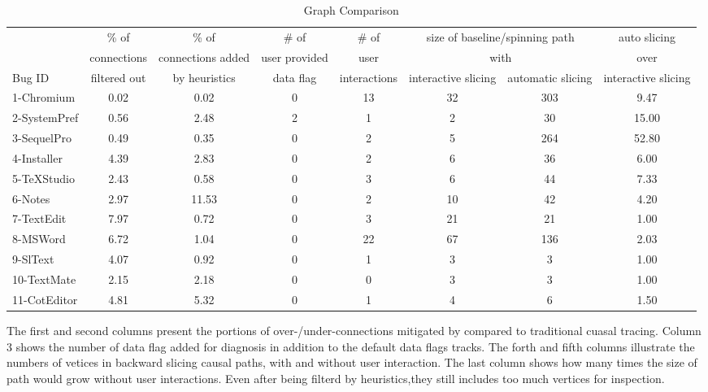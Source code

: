 \begin{table*}[ht]
\footnotesize
\centering
  \begin{tabularx}{\textwidth}{l|ccccccc}
 	   & \% of & \% of & \# of& \# of & \multicolumn{2}{c}{size of baseline/spinning path}& auto slicing\\
       & connections & connections added  & user provided & user  & \multicolumn{2}{c}{with}  & over \\
Bug ID & filtered out & by heuristics & data flag & interactions & interactive slicing & automatic slicing &  interactive slicing\\
\hline
\hline
1-Chromium & 0.02 & 0.02 & 0 & 13 & 32 & 303 & 9.47\\
2-SystemPref & 0.56 & 2.48 & 2 & 1 & 2 & 30 & 15.00\\
3-SequelPro & 0.49 & 0.35 & 0 & 2 & 5 & 264 & 52.80\\
4-Installer & 4.39 & 2.83 & 0 & 2 & 6 & 36  & 6.00\\
5-TeXStudio & 2.43 & 0.58 & 0 & 3 & 6 & 44  & 7.33\\
6-Notes & 2.97 & 11.53 & 0 & 2 & 10 & 42 & 4.20\\
7-TextEdit & 7.97 & 0.72 & 0 & 3 & 21 & 21 & 1.00\\
8-MSWord & 6.72 & 1.04 & 0 & 22 & 67 & 136 & 2.03\\
9-SlText & 4.07 & 0.92 & 0 & 1 & 3 & 3 & 1.00\\
10-TextMate & 2.15 & 2.18 & 0 & 0 & 3 & 3 & 1.00\\
11-CotEditor & 4.81 & 5.32 & 0 & 1 & 4 & 6 & 1.50\\

\hline
  \end{tabularx}

  \parbox{\textwidth}
  {\caption{Graph Comparison} 
    {The first and second columns present the portions of over-/under-connections mitigated by \xxx compared
     to traditional cuasal tracing. Column 3 shows the number of data flag added for diagnosis
     in addition to the default data flags \xxx tracks. The forth and fifth columns illustrate
     the numbers of vetices in backward slicing causal paths, with and without user interaction.
     The last column shows how many times the size of path would grow without user interactions.
	 Even after being filterd by \xxx heuristics,they still includes too much vertices for inspection.
    }
  \label{table:results}
  }

\end{table*}


